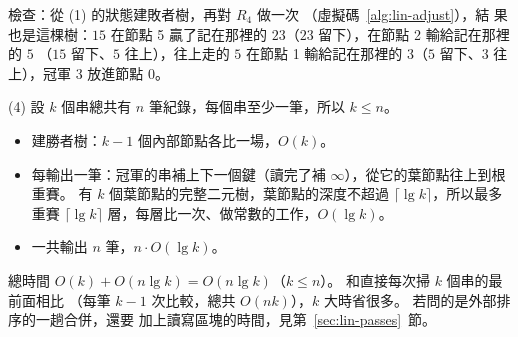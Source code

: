 檢查：從 (1) 的狀態建敗者樹，再對 $R_4$ 做一次 （虛擬碼~\ref{alg:lin-adjust}），結
果也是這棵樹：$15$ 在節點 5 贏了記在那裡的 $23$（$23$ 留下），在節點 2 輸給記在那裡的 $5$
（$15$ 留下、$5$ 往上），往上走的 $5$ 在節點 1 輸給記在那裡的 $3$（$5$ 留下、$3$ 往上），冠軍 $3$ 放進節點 0。

(4) 設 $k$ 個串總共有 $n$ 筆紀錄，每個串至少一筆，所以 $k \le n$。
\begin{itemize}
\item 建勝者樹：$k - 1$ 個內部節點各比一場，$O(k)$。
\item 每輸出一筆：冠軍的串補上下一個鍵（讀完了補 $\infty$），從它的葉節點往上到根重賽。 有
$k$ 個葉節點的完整二元樹，葉節點的深度不超過 $\lceil \lg k \rceil$，所以最多重賽
$\lceil \lg k \rceil$ 層，每層比一次、做常數的工作，$O(\lg k)$。
\item 一共輸出 $n$ 筆，$n \cdot O(\lg k)$。
\end{itemize}
總時間 $O(k) + O(n \lg k) = O(n \lg k)$（$k \le n$）。 和直接每次掃 $k$ 個串的最前面相比
（每筆 $k - 1$ 次比較，總共 $O(nk)$），$k$ 大時省很多。 若問的是外部排序的一趟合併，還要
加上讀寫區塊的時間，見第~\ref{sec:lin-passes}~節。
